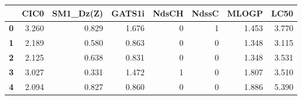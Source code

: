 \begin{tabular}{lrrrrrrr}
\toprule
{} &   CIC0 &  SM1\_Dz(Z) &  GATS1i &  NdsCH &  NdssC &  MLOGP &   LC50 \\
\midrule
\textbf{0} &  3.260 &      0.829 &   1.676 &      0 &      1 &  1.453 &  3.770 \\
\textbf{1} &  2.189 &      0.580 &   0.863 &      0 &      0 &  1.348 &  3.115 \\
\textbf{2} &  2.125 &      0.638 &   0.831 &      0 &      0 &  1.348 &  3.531 \\
\textbf{3} &  3.027 &      0.331 &   1.472 &      1 &      0 &  1.807 &  3.510 \\
\textbf{4} &  2.094 &      0.827 &   0.860 &      0 &      0 &  1.886 &  5.390 \\
\bottomrule
\end{tabular}
